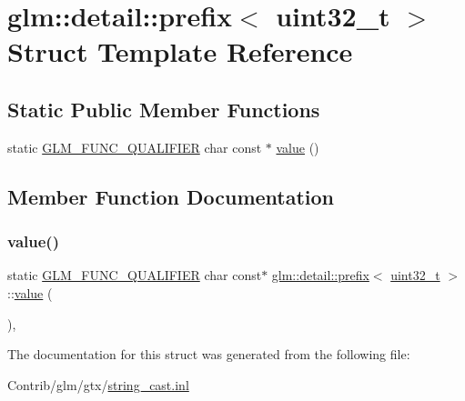 \hypertarget{structglm_1_1detail_1_1prefix_3_01uint32__t_01_4}{}\section{glm\+:\+:detail\+:\+:prefix$<$ uint32\+\_\+t $>$ Struct Template Reference}
\label{structglm_1_1detail_1_1prefix_3_01uint32__t_01_4}
\subsection*{Static Public Member Functions}
\begin{DoxyCompactItemize}
\item 
static \mbox{\hyperlink{setup_8hpp_a33fdea6f91c5f834105f7415e2a64407}{G\+L\+M\+\_\+\+F\+U\+N\+C\+\_\+\+Q\+U\+A\+L\+I\+F\+I\+ER}} char const  $\ast$ \mbox{\hyperlink{structglm_1_1detail_1_1prefix_3_01uint32__t_01_4_a8a36d8e3a869d300408dde031429352e}{value}} ()
\end{DoxyCompactItemize}


\subsection{Member Function Documentation}
\mbox{\label{structglm_1_1detail_1_1prefix_3_01uint32__t_01_4_a8a36d8e3a869d300408dde031429352e}} 
\subsubsection{\texorpdfstring{value()}{value()}}
{\footnotesize\ttfamily static \mbox{\hyperlink{setup_8hpp_a33fdea6f91c5f834105f7415e2a64407}{G\+L\+M\+\_\+\+F\+U\+N\+C\+\_\+\+Q\+U\+A\+L\+I\+F\+I\+ER}} char const$\ast$ \mbox{\hyperlink{structglm_1_1detail_1_1prefix}{glm\+::detail\+::prefix}}$<$ \mbox{\hyperlink{group__gtc__type__precision_ga822ca53a9ad412504532838906276a99}{uint32\+\_\+t}} $>$\+::\mbox{\hyperlink{_s_d_l__opengl__glext_8h_a8ad81492d410ff2ac11f754f4042150f}{value}} (\begin{DoxyParamCaption}{ }\end{DoxyParamCaption})\hspace{0.3cm}{\ttfamily [inline]}, {\ttfamily [static]}}



The documentation for this struct was generated from the following file\+:\begin{DoxyCompactItemize}
\item 
Contrib/glm/gtx/\mbox{\hyperlink{string__cast_8inl}{string\+\_\+cast.\+inl}}\end{DoxyCompactItemize}
